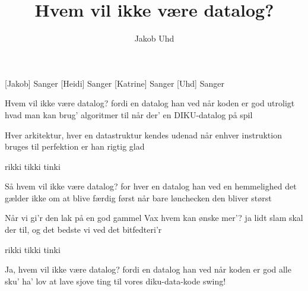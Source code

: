 \documentclass[a4paper,12pt]{article}
\title{Hvem vil ikke være datalog?}
\author{Jakob Uhd}
\begin{document}
\maketitle

\begin{roles}
[Jakob] Sanger
[Heidi] Sanger
[Katrine] Sanger
[Uhd] Sanger
\end{roles}

\begin{song}
Hvem vil ikke være datalog?
fordi en datalog han ved
når koden er god
utroligt hvad man kan brug' algoritmer til
når der' en DIKU-datalog på spil

Hver arkitektur, hver en datastruktur
kendes udenad
når enhver instruktion bruges til perfektion
er han rigtig glad

 rikki tikki tinki

Så hvem vil ikke være datalog?
for hver en datalog han ved
en hemmelighed
det gælder ikke om at blive færdig først
når bare lønchecken den bliver størst


Når vi gi'r den lak på en god gammel Vax
hvem kan ønske mer'?
ja lidt slam skal der til, og det bedste vi ved
det bitfedteri'r

 rikki tikki tinki

Ja, hvem vil ikke være datalog?
fordi en datalog han ved
når koden er god
alle sku' ha' lov at lave sjove ting
til vores diku-data-kode swing!

\end{song}
\end{document}
